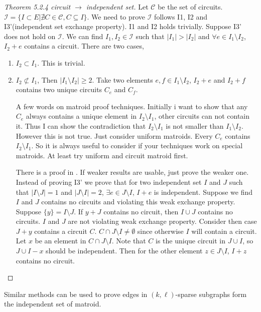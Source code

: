 \documentclass[12pt]{article}
\begin{document}
\begin{proof}[Theorem 5.2.4 circuit $\to$ independent set]
    Let $\mathcal C$ be the set of circuits. $\mathcal{I}=\{I\subset E| \nexists C\in \mathcal C, C\subseteq I\}$. We need to prove $\mathcal{I}$ follows I1, I2 and I3'(independent set exchange property). I1 and I2 holds trivially. Suppose I3' does not hold on $\mathcal I$. We can find $I_1,I_2\in \mathcal{I}$ such that $|I_1| > |I_2|$ and $\forall e\in I_1\setminus I_2$, $I_2+e$ contains a circuit. There are two cases,
    \begin{enumerate}
        \item $I_2\subset I_1$. This is trivial.
        \item $I_2 \not \subset I_1$, Then $|I_1\setminus I_2|\geq 2$. Take two elements $e,f\in I_1\setminus I_2$, $I_2+e$ and $I_2+f$ contains two unique circuits $C_e$ and $C_f$. 
        

        {\scriptsize{A few words on matroid proof techniques. Initially i want to show that any $C_e$ always contains a unique element in $I_2\setminus I_1$, other circuits can not contain it. Thus I can show the contradiction that $I_2\setminus I_1$ is not smaller than $I_1\setminus I_2$. However this is not true. Just consider uniform matroids. Every $C_e$ contains $I_2\setminus I_1$. So it is always useful to consider if your techniques work on special matroids. At least try uniform and circuit matroid first.}}
        
        There is a proof in \cite{schrijver_combinatorial_2003}. If weaker results are usable, just prove the weaker one. Instead of proving I3' we prove that for two independent set $I$ and $J$ such that $|I\setminus J|=1$ and $|J\setminus I| =2$, $\exists e\in J\setminus I$, $I+e$ is independent.
        Suppose we find $I$ and $J$ contains no circuits and violating this weak exchange property. Suppose $\{y\}=I\setminus J$. If $y+J$ contains no circuit, then $I\cup J$ contains no circuits. $I$ and $J$ are not violating weak exchange property. Consider then case $J+y$ contains a circuit $C$. $C\cap J\setminus I\not= \emptyset$ since otherwise $I$ will contain a circuit. Let $x$ be an element in $C\cap J\setminus I$. Note that $C$ is the unique circuit in $J\cup I$, so $J\cup I-x$ should be independent. Then for the other element $z\in J\setminus I$, $I+z$ contains no circuit.
    \end{enumerate}
\end{proof}
Similar methods can be used to prove edges in $(k,\ell)$-sparse subgraphs form the independent set of matroid.
\end{document}
